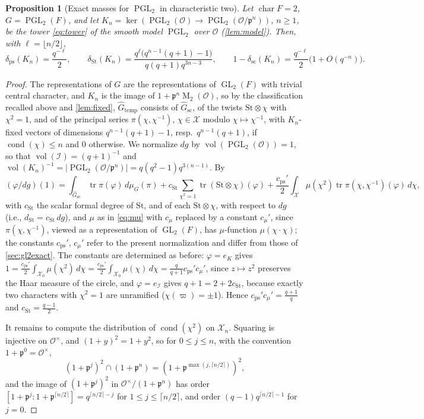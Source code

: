 \documentclass[11pt,reqno]{amsart}
\numberwithin{equation}{section}
\theoremstyle{plain}
\newtheorem{proposition}[theorem]{Proposition}
\theoremstyle{definition}
\theoremstyle{remark}
\theoremstyle{plain}
\newcommand{\OO}{\mathcal{O}}    %
\newcommand{\pp}{\mathfrak{p}}   %
\newcommand{\scd}[1]{\delta_{\mathrm{sc}}(#1)}
\newcommand{\fdeg}[1]{d_{#1}}  %
\newcommand{\Gsc}{\widehat{G}_{\mathrm{sc}}}    %
\newcommand{\Gtemp}{\widehat{G}_{\mathrm{temp}}} %
\newcommand{\Pps}{\delta_{\mathrm{ps}}(K_n)}       %
\newcommand{\Pst}{\delta_{\mathrm{St}}(K_n)}
\newcommand{\Cps}{c_{\mathrm{ps}}}
\newcommand{\Cmu}{c_\mu}
\newcommand{\St}{\mathrm{St}}                   %
\newcommand{\Iw}{\mathcal{I}}                   %
\newcommand{\Xc}{\mathcal{X}}                   %
\newcommand{\abs}[1]{\lvert#1\rvert}
\DeclareMathOperator{\vol}{vol}
\DeclareMathOperator{\tr}{tr}
\DeclareMathOperator{\GL}{GL}
\DeclareMathOperator{\PGL}{PGL}
\DeclareMathOperator{\Mat}{M}
\DeclareMathOperator{\chr}{char}   %
\DeclareMathOperator{\cond}{cond}   %
\begin{document}
\begin{proposition}[Exact masses for $\PGL_2$ in characteristic two]\label{prop:pgl2}
Let $\chr F=2$, $G=\PGL_2(F)$, and let
$K_n=\ker(\PGL_2(\OO)\to\PGL_2(\OO/\pp^n))$, $n\ge1$, be the tower
\eqref{eq:tower} of the smooth model $\PGL_2$ over $\OO$
(\cref{lem:model}). Then, with $\ell=\lfloor n/2\rfloor$,
\[
\Pps=\frac{q^{-\ell}}2,\qquad
\Pst=\frac{q^{\ell}\bigl(q^{n-1}(q+1)-1\bigr)}{q(q+1)q^{3n-3}},\qquad
1-\scd{K_n}=\frac{q^{-\ell}}2\bigl(1+O(q^{-n})\bigr).
\]
\end{proposition}

\begin{proof}
The representations of $G$ are the representations of $\GL_2(F)$ with
trivial central character, and $K_n$ is the image of $1+\pp^n\Mat_2(\OO)$,
so by the classification recalled above and \cref{lem:fixed}, $\Gtemp$
consists of $\Gsc$, of the twists $\St\otimes\chi$ with $\chi^2=1$, and
of the principal series $\pi(\chi,\chi^{-1})$, $\chi\in\Xc$ modulo
$\chi\mapsto\chi^{-1}$, with $K_n$-fixed vectors of dimensions
$q^{n-1}(q+1)-1$, resp.\ $q^{n-1}(q+1)$, if $\cond(\chi)\le n$ and $0$
otherwise. We normalize $dg$ by $\vol(\PGL_2(\OO))=1$, so that
$\vol(\Iw)=(q+1)^{-1}$ and
$\vol(K_n)^{-1}=\abs{\PGL_2(\OO/\pp^n)}=q(q^2-1)q^{3(n-1)}$. By \cite[Theorem~VIII.1.1]{MR1989693}
\[
(\varphi/dg)(1)=\int_{\Gsc}\tr\pi(\varphi)\,d\mu_G(\pi)
+c_{\St}\sum_{\chi^2=1}\tr(\St\otimes\chi)(\varphi)
+\frac{\Cps'}{2}\int_{\Xc}\mu(\chi^2)\tr\pi(\chi,\chi^{-1})(\varphi)\,d\chi,
\]
with $c_{\St}$ the scalar formal degree of $\St$, and of each
$\St\otimes\chi$, with respect to $dg$ (i.e., $\fdeg{\St}=c_{\St}\,dg$), and $\mu$ as in
\eqref{eq:mu} with $\Cmu$ replaced by a constant $\Cmu'$, since
$\pi(\chi,\chi^{-1})$, viewed as a representation of $\GL_2(F)$, has
$\mu$-function $\mu(\chi\cdot\chi)$; the constants $\Cps'$, $\Cmu'$ refer
to the present normalization and differ from those of \cref{sec:gl2exact}.
The constants are determined as before: $\varphi=e_K$ gives
$1=\frac{\Cps'}{2}\int_{\Xc_0}\mu(\chi^2)\,d\chi=\frac{\Cps'}{2}\int_{\Xc_0}\mu(\chi)\,d\chi=\frac{q}{q+1}\Cps'\Cmu'$,
since $z\mapsto z^2$ preserves the Haar measure of the circle, and
$\varphi=e_{\Iw}$ gives $q+1=2+2c_{\St}$, because exactly two characters with
$\chi^2=1$ are unramified ($\chi(\varpi)=\pm1$). Hence
$\Cps'\Cmu'=\frac{q+1}q$ and $c_{\St}=\frac{q-1}2$.

It remains to compute the distribution of $\cond(\chi^2)$ on $\Xc_n$.
Squaring is injective on $\OO^\times$, and $(1+y)^2=1+y^2$, so for
$0\le j\le n$, with the convention $1+\pp^0=\OO^\times$,
\[
(1+\pp^j)^2\cap(1+\pp^n)=(1+\pp^{\max(j,\lceil n/2\rceil)})^2,
\]
and the image of $(1+\pp^j)^2$ in $\OO^\times/(1+\pp^n)$ has
order $[1+\pp^j:1+\pp^{\lceil n/2\rceil}]=q^{\lceil n/2\rceil-j}$
for $1\le j\le\lceil n/2\rceil$, and order
$(q-1)q^{\lceil n/2\rceil-1}$ for $j=0$.


\end{proof}
\end{document}

